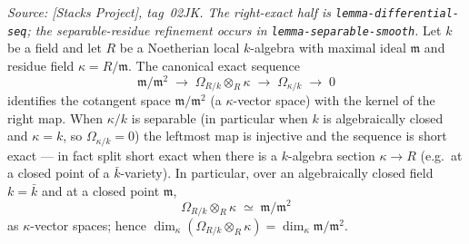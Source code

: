 \begin{lemma}
  \label{lem:cotangent_kahler_over_field}
  \textit{Source: [Stacks Project], tag~02JK. The right-exact half is
  \texttt{lemma-differential-seq}; the separable-residue refinement occurs in
  \texttt{lemma-separable-smooth}.}
  Let \(k\) be a field and let \(R\) be a Noetherian local
  \(k\)-algebra with maximal ideal \(\mathfrak m\) and residue field
  \(\kappa = R/\mathfrak m\). The canonical exact sequence
  \[
    \mathfrak m / \mathfrak m^2
    \;\longrightarrow\; \Omega_{R/k} \otimes_R \kappa
    \;\longrightarrow\; \Omega_{\kappa / k}
    \;\longrightarrow\; 0
  \]
  identifies the cotangent space \(\mathfrak m / \mathfrak m^2\) (a
  \(\kappa\)-vector space) with the kernel of the right map. When
  \(\kappa / k\) is separable (in particular when \(k\) is
  algebraically closed and \(\kappa = k\), so \(\Omega_{\kappa / k}
  = 0\)) the leftmost map is injective and the sequence is short exact
  --- in fact split short exact when there is a \(k\)-algebra section
  \(\kappa \to R\) (e.g.\ at a closed point of a \(\bar k\)-variety).
  In particular, over an algebraically closed field \(k = \bar k\) and
  at a closed point \(\mathfrak m\),
  \[
    \Omega_{R/k} \otimes_R \kappa \;\simeq\; \mathfrak m / \mathfrak m^2
  \]
  as \(\kappa\)-vector spaces; hence
  \(\dim_\kappa(\Omega_{R/k} \otimes_R \kappa)
   = \dim_\kappa \mathfrak m / \mathfrak m^2\).
\end{lemma}

